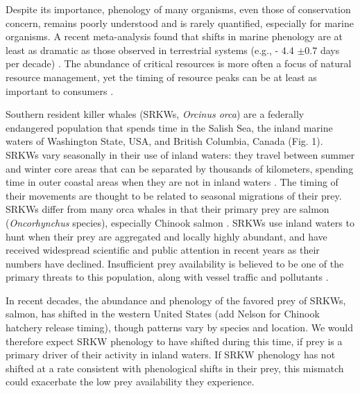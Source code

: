 \documentclass{article}
\begin{document}
\par Despite its importance, phenology of many organisms, even those of conservation concern, remains poorly understood and is rarely quantified, especially for marine organisms. A recent meta-analysis found that shifts in marine phenology are at least as dramatic as those observed in terrestrial systems (e.g., - 4.4 $\pm$0.7 days per decade) \citep{poloczanska2013}. The abundance of critical resources is more often a focus of natural resource management, yet the timing of resource peaks can be at least as important to consumers \citep{hipfner2008}.
\par Southern resident killer whales (SRKWs, \emph{Orcinus orca}) are a federally endangered population that spends time in the Salish Sea, the inland marine waters of Washington State, USA, and British Columbia, Canada (Fig. 1).  SRKWs vary seasonally in their use of inland waters: they travel between summer and winter core areas that can be separated by thousands of kilometers, spending time in outer coastal areas when they are not in inland waters \citep{balcomb1986,krahn2005}. The timing of their movements are thought to be related to seasonal migrations of their prey.  SRKWs differ from many orca whales in that their primary prey are salmon (\emph{Oncorhynchus} species), especially Chinook salmon \citep[\emph{Oncorhynchus tshawytscha}][]{hanson2010}. SRKWs use inland waters to hunt when their prey are aggregated and locally highly abundant, and have received widespread scientific and public attention in recent years as their numbers have declined\citep[e.g., Seattle Times articles,][]{lusseau2009,larson2018, olson2018}. Insufficient prey availability is believed to be one of the primary threats to this population, along with vessel traffic and pollutants \citep{krahn2007,lusseau2009,hanson2010,ward2009}. 
\par In recent decades, the abundance and phenology of the favored prey of SRKWs, salmon, has shifted in the western United States \citep{weinheimer2017,reed2011,ford2006,satterthwaite2014}(add Nelson for Chinook hatchery release timing), though patterns vary by species and location. We would therefore expect SRKW phenology to have shifted during this time, if prey is a primary driver of their activity in inland waters. If SRKW phenology has not shifted at a rate consistent with phenological shifts in their prey, this mismatch could exacerbate the low prey availability they experience. 
\end{document}
